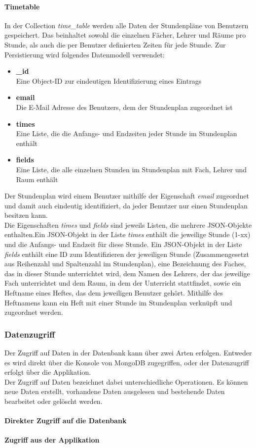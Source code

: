 \paragraph{Timetable}
In der Collection \textit{time\_table} werden alle Daten der Stundenpläne von Benutzern gespeichert. Das beinhaltet sowohl die einzelnen Fächer, Lehrer und Räume pro Stunde, als auch die per Benutzer definierten Zeiten für jede Stunde. Zur Persistierung wird folgendes Datenmodell verwendet:
\begin{itemize}
\item \textbf{\_id}\\ Eine Object-ID zur eindeutigen Identifizierung eines Eintrags
\item \textbf{email}\\ Die E-Mail Adresse des Benutzers, dem der Stundenplan zugeordnet ist
\item \textbf{times}\\ Eine Liste, die die Anfangs- und Endzeiten jeder Stunde im Stundenplan enthält
\item \textbf{fields}\\ Eine Liste, die alle einzelnen Stunden im Stundenplan mit Fach, Lehrer und Raum enthält
\end{itemize}
Der Stundenplan wird einem Benutzer mithilfe der Eigenschaft \textit{email} zugeordnet und damit auch eindeutig identifiziert, da jeder Benutzer nur einen Stundenplan besitzen kann. \\
Die Eigenschaften \textit{times} und \textit{fields} sind jeweils Listen, die mehrere JSON-Objekte enthalten.Ein JSON-Objekt in der Liste \textit{times} enthält die jeweilige Stunde (1-xx) und die Anfangs- und Endzeit für diese Stunde. Ein JSON-Objekt in der Liste \textit{fields} enthält eine ID zum Identifizieren der jeweiligen Stunde (Zusammengesetzt aus Reihenzahl und Spaltenzahl im Stundenplan), eine Bezeichnung des Faches, das in dieser Stunde unterrichtet wird, dem Namen des Lehrers, der das jeweilige Fach unterrichtet und dem Raum, in dem der Unterricht stattfindet, sowie ein Heftname eines Heftes, das dem jeweiligen Benutzer gehört. Mithilfe des Heftnamens kann ein Heft mit einer Stunde im Stundenplan verknüpft und zugeordnet werden.

\subsubsection{Datenzugriff}
Der Zugriff auf Daten in der Datenbank kann über zwei Arten erfolgen. Entweder es wird direkt über die Konsole von MongoDB zugegriffen, oder der Datenzugriff erfolgt über die Applikation. \\
Der Zugriff auf Daten bezeichnet dabei unterschiedliche Operationen. Es können neue Daten erstellt, vorhandene Daten ausgelesen und bestehende Daten bearbeitet oder gelöscht werden.
\paragraph{Direkter Zugriff auf die Datenbank}
\paragraph{Zugriff aus der Applikation}